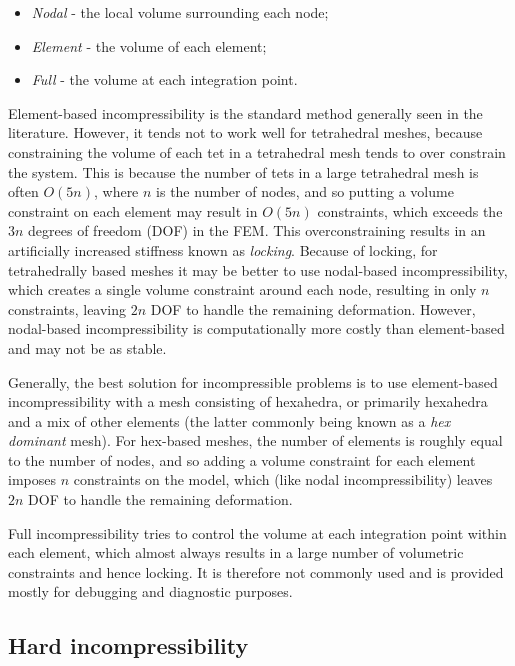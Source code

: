 \begin{itemize}
\item {\it Nodal} - the local volume surrounding each node;
\item {\it Element} - the volume of each element;
\item {\it Full} - the volume at each integration point.
\end{itemize}

Element-based incompressibility is the standard method generally seen
in the literature. However, it tends not to work well for
tetrahedral meshes, because constraining the volume of each tet in a
tetrahedral mesh tends to over constrain the system. This is because
the number of tets in a large tetrahedral mesh is often $O(5 n)$,
where $n$ is the number of nodes, and so putting a volume constraint
on each element may result in $O(5 n)$ constraints, which exceeds the
$3 n$ degrees of freedom (DOF) in the FEM. This overconstraining results in an
artificially increased stiffness known as \emph{locking}. Because of
locking, for tetrahedrally based meshes it may be better to use
nodal-based incompressibility, which creates a single volume constraint
around each node, resulting in only $n$ constraints, leaving $2 n$ DOF
to handle the remaining deformation.  However, nodal-based
incompressibility is computationally more costly than element-based
and may not be as stable.

Generally, the best solution for incompressible problems is to use
element-based incompressibility with a mesh consisting of hexahedra,
or primarily hexahedra and a mix of other elements (the latter
commonly being known as a \emph{hex dominant} mesh). For hex-based
meshes, the number of elements is roughly equal to the number of
nodes, and so adding a volume constraint for each element imposes $n$
constraints on the model, which (like nodal incompressibility)
leaves $2 n$ DOF to handle the remaining deformation.

Full incompressibility tries to control the volume at each
integration point within each element, which almost always results in
a large number of volumetric constraints and hence locking. It is
therefore not commonly used and is provided mostly for debugging and
diagnostic purposes.

\subsection{Hard incompressibility}
\label{HardIncomp:sec}

